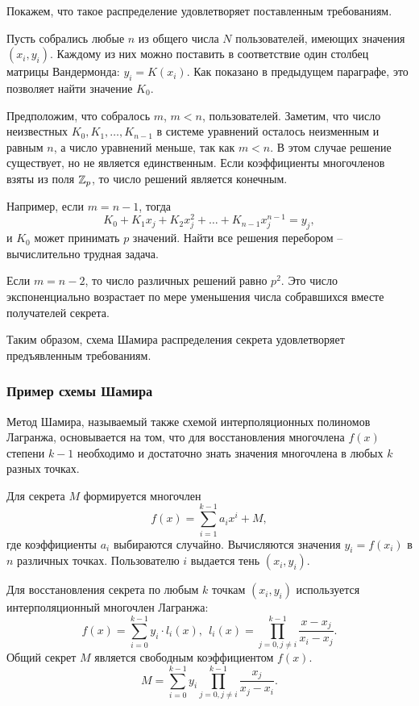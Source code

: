 Покажем, что такое распределение удовлетворяет поставленным требованиям.

Пусть собрались любые $n$ из общего числа $N$ пользователей, имеющих значения $(x_i, y_i)$. Каждому из них можно поставить в соответствие один столбец матрицы Вандермонда: $y_i = K(x_i)$. Как показано в предыдущем параграфе, это позволяет найти  значение $K_0$.

Предположим, что собралось $m$, $m<n$, пользователей. Заметим, что число неизвестных $K_0, K_1, \dots, K_{n-1}$ в системе уравнений осталось неизменным и равным $n$, а число уравнений меньше, так как $m<n$. В этом случае решение существует, но не является единственным. Если коэффициенты многочленов взяты из поля $\mathbb{Z}_p$, то число решений является конечным.

Например, если $m = n - 1$, тогда
    \[ K_0 + K_1 x_j + K_2 x_j^2 + \dots + K_{n-1} x_j^{n-1} = y_j, \]
и $K_0$ может принимать $p$ значений. Найти все решения перебором -- вычислительно трудная задача.

Если $m = n - 2$, то число различных решений равно $p^2$. Это число экспоненциально  возрастает по мере уменьшения числа собравшихся вместе получателей секрета.

Таким образом, схема Шамира распределения секрета удовлетворяет предъявленным требованиям.


\subsubsection{Пример схемы Шамира}

Метод Шамира, называемый также схемой интерполяционных полиномов Лагранжа, основывается на том, что для восстановления многочлена $f(x)$ степени $k-1$ необходимо и достаточно знать значения многочлена в любых $k$ разных точках.

Для секрета $M$ формируется многочлен
    \[ f(x) = \sum\limits_{i=1}^{k-1} a_i x^i + M, \]
где коэффициенты $a_i$ выбираются случайно. Вычисляются значения $y_i = f(x_i)$ в $n$ различных точках. Пользователю $i$ выдается тень $(x_i, y_i)$.

Для восстановления секрета по любым $k$ точкам $(x_i, y_i)$ используется интерполяционный многочлен Лагранжа:
    \[ f(x) = \sum\limits_{i=0}^{k-1} y_i \cdot l_i(x), ~~ l_i(x) = \prod\limits_{j=0, j \neq i}^{k-1} \frac{x - x_j}{x_i - x_j}. \]
Общий секрет $M$ является свободным коэффициентом $f(x)$.
    \[ M = \sum\limits_{i=0}^{k-1} y_i \prod\limits_{j=0, j \neq i}^{k-1} \frac{x_j}{x_j - x_i}. \]

